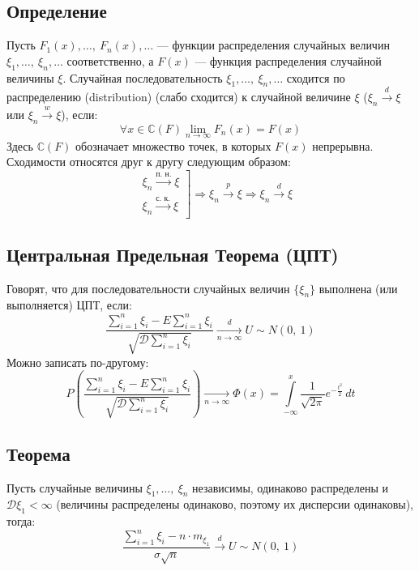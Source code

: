 \documentclass[12pt, a4paper]{article}
\begin{document}
    \subsection*{Определение}
    Пусть $F_1(x),\dots,\ F_n(x),\dots$ --- функции распределения случайных величин $\xi_1,\dots,\ \xi_n,\dots$ соответственно, а $F(x)$ --- функция распределения случайной величины $\xi$. Случайная последовательность $\xi_1,\dots,\ \xi_n,\dots$ сходится по распределению (distribution) (слабо сходится) к случайной величине $\xi$ ($\xi_n \xrightarrow{d} \xi$ или $\xi_n \xrightarrow{w} \xi$), если:
    \[\forall x \in \mathbb{C}(F) \lim_{n\to \infty} F_n(x) = F(x)\]
    Здесь $\mathbb{C}(F)$ обозначает множество точек, в которых $F(x)$ непрерывна.\\
    Сходимости относятся друг к другу следующим образом:
    \[\left. \begin{aligned}
        &\xi_n \xrightarrow[]{\text{п. н.}}\xi\\
        &\xi_n \xrightarrow[]{\text{с. к.}}\xi
    \end{aligned}\right]\Rightarrow \xi_n\xrightarrow[]{p} \xi \Rightarrow \xi_n\xrightarrow{d} \xi\]
    \subsection*{Центральная Предельная Теорема (ЦПТ)}
    Говорят, что для последовательности случайных величин $\{\xi_n\}$ выполнена (или выполняется) ЦПТ, если:
    \[\frac{\sum_{i = 1}^{n} \xi_i - E\sum_{i = 1}^{n} \xi_i}{\sqrt{\mathcal{D}\sum_{i = 1}^{n} \xi_i}}\xrightarrow[n\to \infty]{d} U \sim N(0,\ 1)\]
    Можно записать по-другому:
    \[P\left(\frac{\sum_{i = 1}^{n} \xi_i - E\sum_{i = 1}^{n} \xi_i}{\sqrt{\mathcal{D}\sum_{i = 1}^{n} \xi_i}}\right) \xrightarrow[n\to \infty]{} \Phi(x) = \int\limits_{-\infty}^{x} \frac{1}{\sqrt{2\pi}}e^{-\frac{t^2}{2}}\, dt\]
    \subsection*{Теорема}
    Пусть случайные величины $\xi_1,\dots,\ \xi_n$ независимы, одинаково распределены и $\mathcal{D}\xi_1 < \infty$ (величины распределены одинаково, поэтому их дисперсии одинаковы), тогда:
    \[\frac{\sum_{i = 1}^{n} \xi_i - n\cdot m_{\xi_1}}{\sigma\sqrt{n}}\xrightarrow{d} U\sim N(0,\ 1)\]
\end{document}
